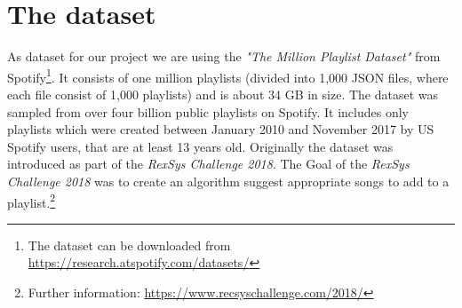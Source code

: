 \section{The dataset}

As dataset for our project we are using the \textit{"The Million Playlist Dataset"} \citep{recsysChallenge} from Spotify\footnote{The dataset can be downloaded from \url{https://research.atspotify.com/datasets/}}. It consists of one million playlists (divided into 1,000 JSON files, where each file consist of 1,000 playlists) and is about 34 GB in size. The dataset was sampled from over four billion public playlists on Spotify. It includes only playlists which were created between January 2010 and November 2017 by US Spotify users, that are at least 13 years old. Originally the dataset was introduced as part of the \textit{RexSys Challenge 2018}. The Goal of the \textit{RexSys Challenge 2018} was to create an algorithm suggest appropriate songs to add to a playlist.\footnote{Further information: \url{https://www.recsyschallenge.com/2018/}}




